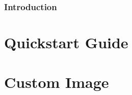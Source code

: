 \documentclass[a4paper,11pt]{article}
\begin{document}


\tableofcontents
\newpage

\section*{Introduction}

\newpage

\part{Quickstart Guide}

\newpage

\part{Custom Image}

\end{document}
